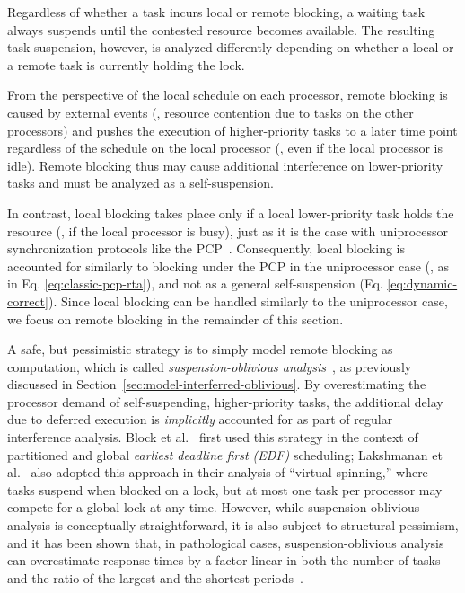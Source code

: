 Regardless of whether a task incurs local or remote blocking, a waiting task always suspends until the contested resource becomes available. The resulting task suspension, however, is analyzed differently depending on whether a local or a remote task is currently holding the lock.

From the perspective of the local schedule on each processor, remote blocking is caused by external events (\ie, resource contention due to tasks on the other processors) and pushes the execution of higher-priority tasks to a later time point regardless of the schedule on the local processor (\ie, even if the local processor is idle). Remote blocking thus may cause additional interference on lower-priority tasks and must be analyzed as a self-suspension.

In contrast, local blocking takes place only if a local lower-priority task holds the resource (\ie, if the local processor is busy), just as it is the case with uniprocessor synchronization protocols like the PCP~\cite{SRL:90}. Consequently, local blocking is accounted for similarly to blocking under the PCP in the uniprocessor case (\ie, as in Eq. \eqref{eq:classic-pcp-rta}), and not as a general self-suspension (Eq. \eqref{eq:dynamic-correct}). Since local blocking can be handled similarly to the uniprocessor case, we focus on remote blocking in the remainder of this section.


A safe, but pessimistic strategy is to simply model remote blocking as computation, which is called \emph{suspension-oblivious analysis}~\cite{BA:10b}, as previously discussed in Section~\ref{sec:model-interferred-oblivious}. By overestimating the processor demand of self-suspending, higher-priority tasks, the additional delay due to deferred execution is \emph{implicitly} accounted for as part of regular interference analysis. Block et al.~\cite{block-2007} first used this strategy in the context of partitioned and global \emph{earliest deadline first (EDF)} scheduling; Lakshmanan et al.~\cite{lakshmanan-2009} also adopted this approach in their analysis of ``virtual spinning,'' where tasks suspend when blocked on a lock, but at most one task per processor may compete for a global lock at any time. However, while suspension-oblivious analysis is conceptually straightforward, it is also subject to structural pessimism, and it has been shown that, in pathological cases, suspension-oblivious analysis can overestimate response times by a factor linear in both the number of tasks and the ratio of the largest and the shortest periods~\cite{wieder-2013}.

